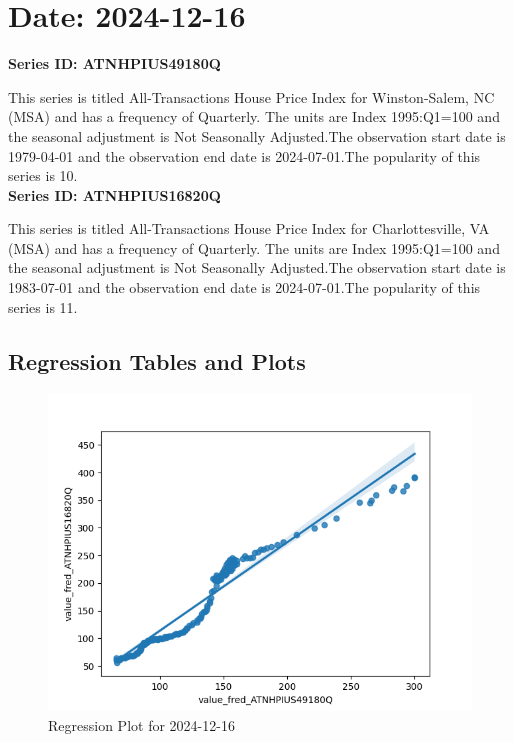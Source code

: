 \section{Date: 2024-12-16}
\noindent \textbf{Series ID: ATNHPIUS49180Q} 

\noindent This series is titled All-Transactions House Price Index for Winston-Salem, NC (MSA) and has a frequency of Quarterly. The units are Index 1995:Q1=100 and the seasonal adjustment is Not Seasonally Adjusted.The observation start date is 1979-04-01 and the observation end date is 2024-07-01.The popularity of this series is 10. \\ 

\noindent \textbf{Series ID: ATNHPIUS16820Q} 

\noindent This series is titled All-Transactions House Price Index for Charlottesville, VA (MSA) and has a frequency of Quarterly. The units are Index 1995:Q1=100 and the seasonal adjustment is Not Seasonally Adjusted.The observation start date is 1983-07-01 and the observation end date is 2024-07-01.The popularity of this series is 11. \\ 

\subsection{Regression Tables and Plots}


\begin{figure}
\centering
\includegraphics[scale = 0.9]{plots/plot_2024-12-16.png}
\caption{Regression Plot for 2024-12-16}
\end{figure}
\newpage
